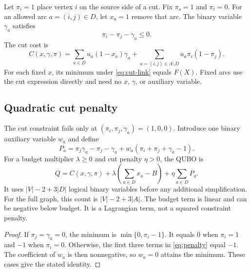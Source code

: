 \documentclass[review,onefignum,onetabnum]{siamart171218}
\begin{document}
Let $\pi_i=1$ place vertex $i$ on the source side of a cut.
Fix $\pi_s=1$ and $\pi_t=0$.
For an allowed arc $a=(i,j)\in D$, let $x_a=1$ remove that arc.
The binary variable $\gamma_a$ satisfies
\begin{equation}\label{eq:cut-link}
 \pi_i-\pi_j-\gamma_a\leq 0.
\end{equation}
The cut cost is
\begin{equation}\label{eq:cut-cost}
 C(x,\gamma,\pi)=
 \sum_{a\in D}u_a(1-x_a)\gamma_a
 +\sum_{a=(i,j)\in A\setminus D}u_a\pi_i(1-\pi_j).
\end{equation}
For each fixed $x$, its minimum under \cref{eq:cut-link} equals $F(X)$.
Fixed arcs use the cut expression directly and need no $x$, $\gamma$, or auxiliary variable.

\subsection{Quadratic cut penalty}
The cut constraint fails only at $(\pi_i,\pi_j,\gamma_a)=(1,0,0)$.
Introduce one binary auxiliary variable $w_a$ and define
\begin{equation}\label{eq:penalty}
 P_a=\pi_j\gamma_a-\pi_j-\gamma_a
       +w_a(\pi_i+\pi_j+\gamma_a-1).
\end{equation}
For a budget multiplier $\lambda\geq 0$ and cut penalty $\eta>0$, the QUBO is
\begin{equation}\label{eq:qubo}
 Q=C(x,\gamma,\pi)+\lambda\left(\sum_{a\in D}x_a-B\right)
           +\eta\sum_{a\in D}P_a.
\end{equation}
It uses $|V|-2+3|D|$ logical binary variables before any additional simplification.
For the full graph, this count is $|V|-2+3|A|$.
The budget term is linear and can be negative below budget.
It is a Lagrangian term, not a squared constraint penalty.

\begin{proof}
If $\pi_j=\gamma_a=0$, the minimum is $\min\{0,\pi_i-1\}$.
It equals $0$ when $\pi_i=1$ and $-1$ when $\pi_i=0$.
Otherwise, the first three terms in \cref{eq:penalty} equal $-1$.
The coefficient of $w_a$ is then nonnegative, so $w_a=0$ attains the minimum.
These cases give the stated identity.
\end{proof}
\end{document}
